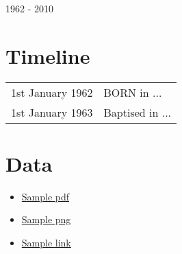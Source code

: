 \begin{center}
\huge{1962 - 2010}
\end{center}

\vspace{1in}

\begin{center}
\end{center}

\newpage
\section{Timeline}
\begin{table}[h]
\renewcommand\arraystretch{1.4}
\begin{tabular}{@{\,}r <{\hskip 2pt} !{\foo} >{\raggedright\arraybackslash}p{20cm}}
\addlinespace[1.5ex]
1st January 1962 & BORN in ...\\
1st January 1963 & Baptised in ... \\
\end{tabular}
\end{table}

\section{Data}
\begin{itemize}
\item \href{run:people/Child1/sample.pdf}{Sample pdf}
\item \href{run:people/Child1/sample.png}{Sample png}
\item \href{https://github.com/StevenElsworth?tab=repositories}{Sample link} 
\end{itemize}